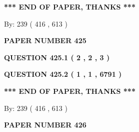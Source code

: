 \documentclass[12pt]{article}
\begin{document}
   
   
   
   
\vspace{1.0in} 
{\textbf{\large{ *** END OF PAPER, THANKS *** }}} 
   
   
\hspace{1.0in} By: 
 239 ( 416 ,  613 )
   
   
   
   
\newpage 
\setcounter{page}{ 
   425001 } 
   
   
   
   
 {\textbf{ \Large{ PAPER NUMBER  425  }}}
   
   
\vspace{0.2in}
   
   
   
   
   
   
 \vspace{0.2in}
 
 
 
 
   
   
  
\vspace{0.2in}
  
{\textbf{\Large{QUESTION
425.1 
 ( 2 , 2 , 3 )
}}}
  
  
  
\vspace{0.2in}
  
{\textbf{\Large{QUESTION
425.2 
 ( 1 , 1 , 6791 )
}}}
  
  
   
   
 \vspace{0.2in}
 
   
   
   
   
\vspace{1.0in} 
{\textbf{\large{ *** END OF PAPER, THANKS *** }}} 
   
   
\hspace{1.0in} By: 
 239 ( 416 ,  613 )
   
   
   
   
\newpage 
\setcounter{page}{ 
   426001 } 
   
   
   
   
 {\textbf{ \Large{ PAPER NUMBER  426  }}}
   
   
\vspace{0.2in}
   
\end{document}
